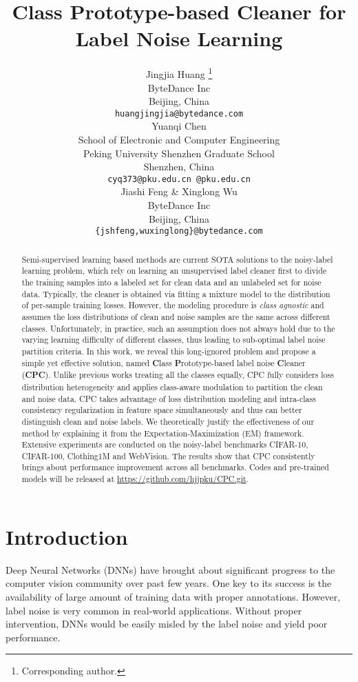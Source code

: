 \documentclass{article} \usepackage{iclr2023_conference,times}
\title{Class Prototype-based Cleaner for Label Noise Learning}
\author{Jingjia Huang \thanks{Corresponding author.} \\
ByteDance Inc\\
Beijing, China \\
\texttt{huangjingjia@bytedance.com} \\
\And
Yuanqi Chen\\
School of Electronic and Computer Engineering \\
Peking University Shenzhen Graduate School \\
Shenzhen, China \\
\texttt{cyq373@pku.edu.cn @pku.edu.cn} \\
\AND
Jiashi Feng \& Xinglong Wu \\
ByteDance Inc\\
Beijing, China \\
\texttt{\{jshfeng,wuxinglong\}@bytedance.com} \\
}
\begin{document}
\maketitle

\begin{abstract}
Semi-supervised learning based methods are current SOTA solutions to the noisy-label learning problem, which rely on learning an unsupervised label cleaner first to divide the training samples into a  labeled set for clean data and an unlabeled set for noise data. 
Typically, the cleaner is   obtained  via fitting a mixture model to  the distribution of  per-sample training losses.  However, the modeling procedure is  \emph{class agnostic} and  assumes the loss distributions of clean and noise samples are the same across different classes. Unfortunately, in practice, such an assumption does not always hold due to the varying learning difficulty of different classes, thus leading to sub-optimal   label noise partition criteria. In this work, we reveal this long-ignored problem and propose a simple yet effective solution, named  \textbf{C}lass \textbf{P}rototype-based label noise \textbf{C}leaner (\textbf{CPC}). Unlike previous works treating all the classes equally, CPC fully considers loss distribution heterogeneity and applies  class-aware modulation to partition the clean and noise data. CPC takes advantage of loss distribution modeling and intra-class consistency regularization in feature space simultaneously  and thus can  better distinguish clean and noise labels. We theoretically justify the effectiveness of our method by explaining it from the Expectation-Maximization (EM) framework. Extensive experiments are conducted on the noisy-label benchmarks CIFAR-10, CIFAR-100, Clothing1M and WebVision. The results show that CPC consistently brings about performance improvement across all benchmarks. Codes and pre-trained models will be released at \url{https://github.com/hjjpku/CPC.git}.
\end{abstract}

\section{Introduction}
Deep Neural Networks (DNNs) have brought about significant progress to the computer vision community over past few years. One key to its success is the availability of large amount of training data with proper annotations. However, label noise is very common in real-world applications. Without proper intervention, DNNs would be easily misled by the label noise and yield  poor performance. 
\end{document}
